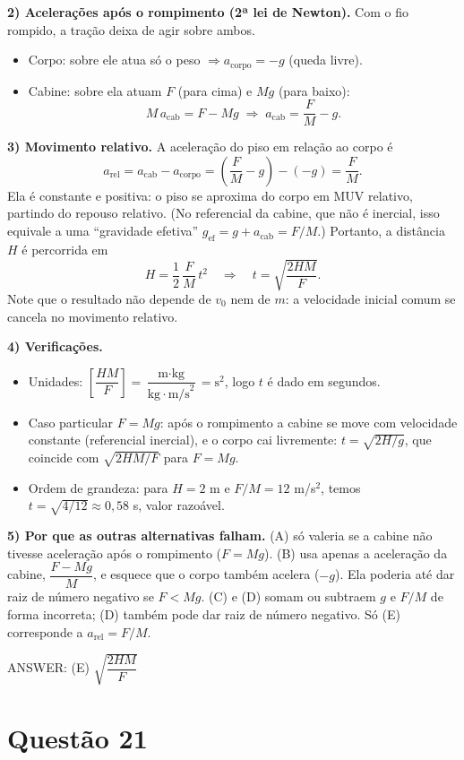 \documentclass{article}%
\begin{document}
\textbf{2) Acelerações após o rompimento (2ª lei de Newton).} Com o fio rompido, a tração deixa de agir sobre ambos.
\begin{itemize}
\item Corpo: sobre ele atua só o peso $\Rightarrow a_{\text{corpo}}=-g$ (queda livre).
\item Cabine: sobre ela atuam $F$ (para cima) e $Mg$ (para baixo):
\[
M\,a_{\text{cab}}=F-Mg \;\Rightarrow\; a_{\text{cab}}=\frac{F}{M}-g .
\]
\end{itemize}

\textbf{3) Movimento relativo.} A aceleração do piso em relação ao corpo é
\[
a_{\text{rel}}=a_{\text{cab}}-a_{\text{corpo}}=\left(\frac{F}{M}-g\right)-(-g)=\frac{F}{M}.
\]
Ela é constante e positiva: o piso se aproxima do corpo em MUV relativo, partindo do repouso relativo. (No referencial da cabine, que não é inercial, isso equivale a uma ``gravidade efetiva'' $g_{\text{ef}}=g+a_{\text{cab}}=F/M$.) Portanto, a distância $H$ é percorrida em
\[
H=\frac{1}{2}\,\frac{F}{M}\,t^{2}\quad\Longrightarrow\quad t=\sqrt{\frac{2HM}{F}} .
\]
Note que o resultado não depende de $v_0$ nem de $m$: a velocidade inicial comum se cancela no movimento relativo.

\textbf{4) Verificações.}
\begin{itemize}
\item Unidades: $\left[\dfrac{HM}{F}\right]=\dfrac{\text{m}\cdot\text{kg}}{\text{kg}\cdot\text{m/s}^2}=\text{s}^2$, logo $t$ é dado em segundos.
\item Caso particular $F=Mg$: após o rompimento a cabine se move com velocidade constante (referencial inercial), e o corpo cai livremente: $t=\sqrt{2H/g}$, que coincide com $\sqrt{2HM/F}$ para $F=Mg$.
\item Ordem de grandeza: para $H=2$ m e $F/M=12$ m/s$^2$, temos $t=\sqrt{4/12}\approx 0{,}58$ s, valor razoável.
\end{itemize}

\textbf{5) Por que as outras alternativas falham.} (A) só valeria se a cabine não tivesse aceleração após o rompimento ($F=Mg$). (B) usa apenas a aceleração da cabine, $\dfrac{F-Mg}{M}$, e esquece que o corpo também acelera ($-g$). Ela poderia até dar raiz de número negativo se $F<Mg$. (C) e (D) somam ou subtraem $g$ e $F/M$ de forma incorreta; (D) também pode dar raiz de número negativo. Só (E) corresponde a $a_{\text{rel}}=F/M$.

ANSWER: (E) $\sqrt{\dfrac{2HM}{F}}$%
\newpage%
\section*{Questão 21}
\end{document}
